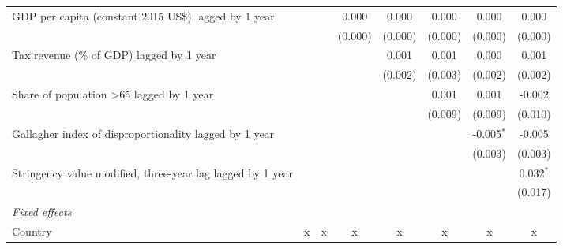 \begin{tabular}{lccccccc}
   GDP per capita (constant 2015 US\$) lagged by 1 year                                  &                &                & 0.000         & 0.000          & 0.000         & 0.000          & 0.000\\   
                                                                                         &                &                & (0.000)       & (0.000)        & (0.000)       & (0.000)        & (0.000)\\   
   Tax revenue (\% of GDP) lagged by 1 year                                              &                &                &               & 0.001          & 0.001         & 0.000          & 0.001\\   
                                                                                         &                &                &               & (0.002)        & (0.003)       & (0.002)        & (0.002)\\   
   Share of population >65 lagged by 1 year                                              &                &                &               &                & 0.001         & 0.001          & -0.002\\   
                                                                                         &                &                &               &                & (0.009)       & (0.009)        & (0.010)\\   
   Gallagher index of disproportionality lagged by 1 year                                &                &                &               &                &               & -0.005$^{*}$   & -0.005\\   
                                                                                         &                &                &               &                &               & (0.003)        & (0.003)\\   
   Stringency value modified, three-year lag lagged by 1 year                            &                &                &               &                &               &                & 0.032$^{*}$\\   
                                                                                         &                &                &               &                &               &                & (0.017)\\   
   \emph{Fixed effects}\\
   Country                                                                               & x              & x              & x             & x              & x             & x              & x\\  

\end{tabular}
